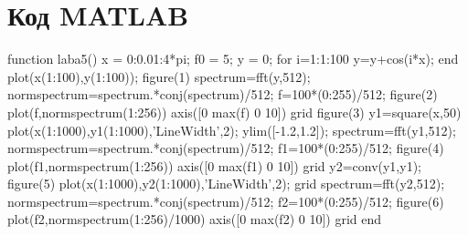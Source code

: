 \documentclass[10pt,a4paper]{report}
\begin{document}
\section{Код MATLAB}
function laba5()\newline
x = 0:0.01:4*pi;\newline
f0 = 5;\newline
y = 0;\newline
for i=1:1:100\newline
    y=y+cos(i*x);\newline
end\newline
plot(x(1:100),y(1:100));\newline
figure(1)\newline
spectrum=fft(y,512);\newline
normspectrum=spectrum.*conj(spectrum)/512;\newline
f=100*(0:255)/512;\newline
figure(2)\newline
plot(f,normspectrum(1:256))\newline
axis([0 max(f) 0 10])\newline
grid \newline
figure(3)\newline
y1=square(x,50)\newline
plot(x(1:1000),y1(1:1000),'LineWidth',2);\newline
ylim([-1.2,1.2]);\newline
spectrum=fft(y1,512);\newline
normspectrum=spectrum.*conj(spectrum)/512;\newline
f1=100*(0:255)/512;\newline
figure(4)\newline
plot(f1,normspectrum(1:256))\newline
axis([0 max(f1) 0 10])\newline
grid \newline
y2=conv(y1,y1);\newline
figure(5)\newline
plot(x(1:1000),y2(1:1000),'LineWidth',2);\newline
grid\newline
spectrum=fft(y2,512);\newline
normspectrum=spectrum.*conj(spectrum)/512;\newline
f2=100*(0:255)/512;\newline
figure(6)\newline
plot(f2,normspectrum(1:256)/1000)\newline
axis([0 max(f2) 0 10])\newline
grid \newline
end\newline
\end{document}

